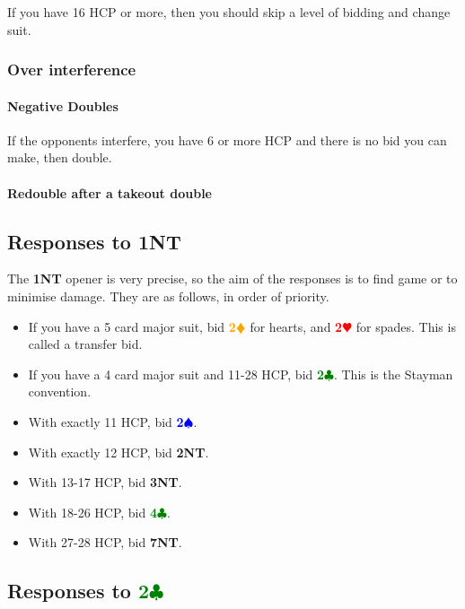 \documentclass{article}
\newcommand{\Hs}{\textcolor{Red}{$\varheart$}}
\newcommand{\Ss}{\textcolor{Blue}{$\spadesuit$}}
\newcommand{\Ds}{\textcolor{Orange}{$\vardiamond$}}
\newcommand{\Cs}{\textcolor{Green}{$\clubsuit$}}
\newcommand{\NTs}{\textbf{\footnotesize{NT}}}
\renewcommand{\H}[1]{\textcolor{Red}{\textbf{#1}\Hs}}
\renewcommand{\S}[1]{\textcolor{Blue}{\textbf{#1}\Ss}}
\newcommand{\D}[1]{\textcolor{Orange}{\textbf{#1}\Ds}}
\newcommand{\C}[1]{\textcolor{Green}{\textbf{#1}\Cs}}
\newcommand{\NT}[1]{\textbf{#1\NTs}}
\begin{document}
If you have 16 HCP or more, then you should skip a level of bidding and change suit.

\subsubsection{Over interference}

\paragraph{Negative Doubles}

If the opponents interfere, you have 6 or more HCP and there is no bid you can make, then double.

\paragraph{Redouble after a takeout double}


\subsection{Responses to \NT{1}}

The \NT{1} opener is very precise, so the aim of the responses is to find game or to minimise damage. They are as follows, in order of priority.

\begin{itemize}
\item If you have a 5 card major suit, bid \D{2} for hearts, and \H{2} for spades. This is called a transfer bid.
\item If you have a 4 card major suit and 11-28 HCP, bid \C{2}. This is the Stayman convention.
\item With exactly 11 HCP, bid \S{2}.
\item With exactly 12 HCP, bid \NT{2}.
\item With 13-17 HCP, bid \NT{3}.
\item With 18-26 HCP, bid \C{4}.
\item With 27-28 HCP, bid \NT{7}.
\end{itemize}

\subsection{Responses to \C{2}}
\end{document}
